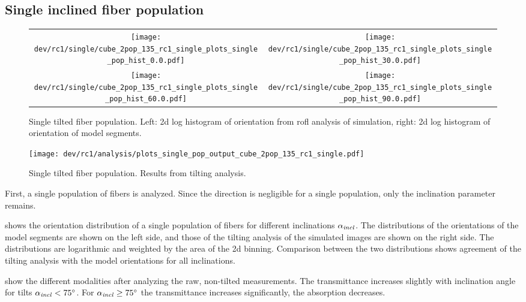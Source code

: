 \subsection{Single inclined fiber population}
\label{sec:resSingleIncl}
% 
\begin{figure}[!t]
\centering
\newlength{\width}
\setlength{\width}{0.45\textwidth}
\begin{tabular}{c|c}
    \texttt{[image: dev/rc1/single/cube\_2pop\_135\_rc1\_single\_plots\_single\_pop\_hist\_0.0.pdf]}&
    \texttt{[image: dev/rc1/single/cube\_2pop\_135\_rc1\_single\_plots\_single\_pop\_hist\_30.0.pdf]}\\ 
    \texttt{[image: dev/rc1/single/cube\_2pop\_135\_rc1\_single\_plots\_single\_pop\_hist\_60.0.pdf]}&
    \texttt{[image: dev/rc1/single/cube\_2pop\_135\_rc1\_single\_plots\_single\_pop\_hist\_90.0.pdf]}
\end{tabular}
% 
\caption[sim]{Single tilted fiber population. Left: 2d log histogram of orientation from rofl analysis of simulation, right: 2d log histogram of orientation of model segments. }
\label{fig:single_fiber_pop_hist}
\end{figure}
% 
\begin{figure}[!p]
\centering
\texttt{[image: dev/rc1/analysis/plots\_single\_pop\_output\_cube\_2pop\_135\_rc1\_single.pdf]}
\caption[]{Single tilted fiber population. Results from tilting analysis.}
\label{fig:single_fiber_pop_rofl}
\end{figure}
% 
First, a single population of fibers is analyzed.
Since the direction is negligible for a single population, only the inclination parameter \modelInc{} remains.
\par
% 
 shows the orientation distribution of a single population of fibers for different inclinations $\textnormal{$\alpha_{\mathit{incl}}$}{}$.
The distributions of the orientations of the model segments are shown on the left side, and those of the tilting analysis of the simulated images are shown on the right side.
The distributions are logarithmic and weighted by the area of the 2d binning.
Comparison between the two distributions shows agreement of the tilting analysis with the model orientations for all inclinations.
\par
% 
 show the different modalities after analyzing the raw, non-tilted measurements.
The transmittance increases slightly with inclination angle for tilts $\textnormal{$\alpha_{\mathit{incl}}$}<\SI{75}{\degree}$.
For $\textnormal{$\alpha_{\mathit{incl}}$} \ge \SI{75}{\degree}$ the transmittance increases significantly, \ie{} the absorption decreases.
